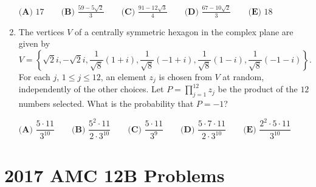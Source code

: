 \documentclass{article}
\begin{document}
\begin{enumerate}[label=\arabic*., itemsep=0.5em]
\(\textbf{(A) }17\qquad\textbf{(B) }\frac{59 - 5\sqrt{2}}{3}\qquad\textbf{(C) }\frac{91 - 12\sqrt{3}}{4}\qquad\textbf{(D) }\frac{67 - 10\sqrt{2}}{3}\qquad\textbf{(E) }18\)\par \vspace{0.5em}\item The vertices \(V\) of a centrally symmetric hexagon in the complex plane are given by 
\begin{equation*}
V=\left\{   \sqrt{2}i,-\sqrt{2}i, \frac{1}{\sqrt{8}}(1+i),\frac{1}{\sqrt{8}}(-1+i),\frac{1}{\sqrt{8}}(1-i),\frac{1}{\sqrt{8}}(-1-i) \right\}.
\end{equation*}
 For each \(j\), \(1\leq j\leq 12\), an element \(z_j\) is chosen from \(V\) at random, independently of the other choices. Let \(P={\prod}_{j=1}^{12}z_j\) be the product of the \(12\) numbers selected. What is the probability that \(P=-1\)?

\(\textbf{(A) } \dfrac{5\cdot11}{3^{10}} \qquad \textbf{(B) } \dfrac{5^2\cdot11}{2\cdot3^{10}} \qquad \textbf{(C) } \dfrac{5\cdot11}{3^{9}} \qquad \textbf{(D) } \dfrac{5\cdot7\cdot11}{2\cdot3^{10}} \qquad \textbf{(E) } \dfrac{2^2\cdot5\cdot11}{3^{10}}\)\par \vspace{0.5em}
\end{enumerate}
\newpage\section*{2017 AMC 12B Problems}
\end{document}
